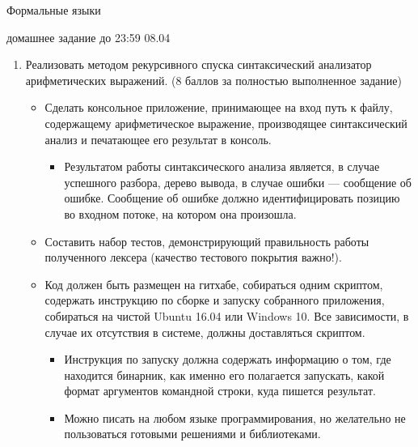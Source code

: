 \documentclass{article}
\begin{document}
\begin{center} {\LARGE Формальные языки} \end{center}

\begin{center} {\Large домашнее задание до 23:59 08.04} \end{center}
\bigskip

\begin{enumerate}
  \item Реализовать методом рекурсивного спуска синтаксический анализатор арифметических выражений. (8 баллов за полностью выполненное задание)
    \begin{itemize}
        \item Сделать консольное  приложение, принимающее на вход путь к файлу, содержащему арифметическое выражение, производящее синтаксический анализ и печатающее его результат в консоль.
        \begin{itemize}
            \item Результатом работы синтаксического анализа является, в случае успешного разбора, дерево вывода, в случае ошибки --- сообщение об ошибке. Сообщение об ошибке должно идентифицировать позицию во входном потоке, на котором она произошла.
        \end{itemize}
        \item Составить набор тестов, демонстрирующий правильность работы полученного лексера (качество тестового покрытия важно!).
        \item Код должен быть размещен на гитхабе, собираться одним скриптом, содержать инструкцию по сборке и запуску собранного приложения, собираться на чистой Ubuntu 16.04 или Windows 10. Все зависимости, в случае их отсутствия в системе, должны доставляться скриптом.
        \begin{itemize}
            \item Инструкция по запуску должна содержать информацию о том, где находится бинарник, как именно его полагается запускать, какой формат аргументов командной строки, куда пишется результат.
            \item Можно писать на любом языке программирования, но желательно не пользоваться готовыми решениями и библиотеками. 
        \end{itemize} 
     \end{itemize}
\end{enumerate}

\medskip
\end{document}

